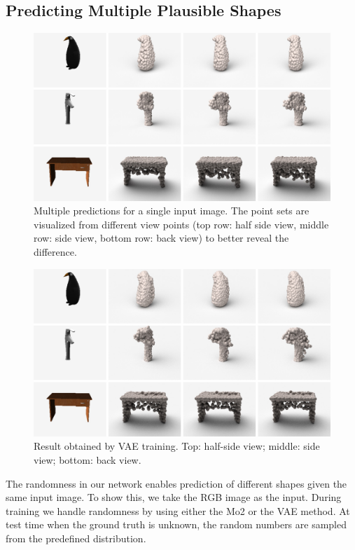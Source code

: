 \subsection{Predicting Multiple Plausible Shapes}
\label{sec:exp:gan}
\begin{figure}[t!]
  \centering
  \includegraphics[width=0.9\linewidth]{./fig/ambiguity}
  \caption{Multiple predictions for a single input image. The point sets are visualized from different view points (top row: half side view, middle row: side view, bottom row: back view) to better reveal the difference.}\label{fig:deformation}
\end{figure}

\begin{figure}
\centering
\includegraphics[width=0.9\linewidth]{./fig/show_vae}
\caption{Result obtained by VAE training. Top: half-side view; middle: side view; bottom: back view.}
\label{fig:show_vae}
\end{figure}

The randomness in our network enables prediction of different shapes given the same input image. To show this, we take the RGB image as the input. During training we handle randomness by using either the Mo2 or the VAE method. At test time when the ground truth is unknown, the random numbers are sampled from the predefined distribution.

